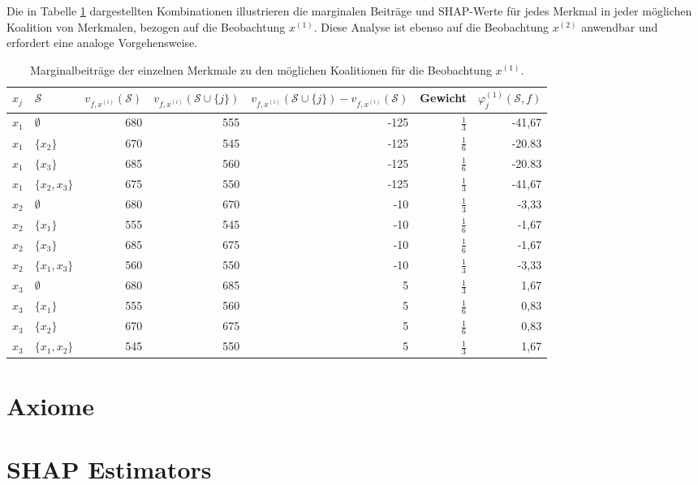 Die in Tabelle \ref{tab:shapley_marginal_features} dargestellten Kombinationen illustrieren die marginalen Beiträge und SHAP-Werte 
für jedes Merkmal in jeder möglichen Koalition von Merkmalen, bezogen auf die Beobachtung $x^{(1)}$. 
Diese Analyse ist ebenso auf die Beobachtung $x^{(2)}$ anwendbar und erfordert eine analoge Vorgehensweise.

\begin{table}[H]
    \footnotesize
    \begin{tabularx}{\textwidth}{XXrrrrr}
    \toprule
    $x_{j}$ & $\mathcal{S}$ & $v_{f, x^{(i)}}(\mathcal{S})$ & $v_{f, x^{(i)}}(\mathcal{S} \cup \{j\})$ & $v_{f, x^{(i)}}(\mathcal{S} \cup \{j\}) - v_{f, x^{(i)}}(\mathcal{S})$ & Gewicht & $\varphi_{j}^{(1)}(\mathcal{S}, f)$\\
    \midrule
    $x_1$ & $\emptyset$ & 680 & 555 & -125 & $\frac{1}{3}$ & -41,67 \\
    $x_1$ & $\{x_2\}$ & 670 & 545 & -125 & $\frac{1}{6}$ & -20.83 \\
    $x_1$ & $\{x_3\}$ & 685 & 560 & -125 & $\frac{1}{6}$ & -20.83 \\
    $x_1$ & $\{x_2, x_3\}$ & 675 & 550 & -125 & $\frac{1}{3}$ & -41,67 \\
    $x_2$ & $\emptyset$ & 680 & 670 & -10 & $\frac{1}{3}$ & -3,33 \\
    $x_2$ & $\{x_1\}$ & 555 & 545 & -10 & $\frac{1}{6}$ & -1,67 \\
    $x_2$ & $\{x_3\}$ & 685 & 675 & -10 & $\frac{1}{6}$ & -1,67 \\
    $x_2$ & $\{x_1, x_3\}$ & 560 & 550 & -10 & $\frac{1}{3}$ & -3,33 \\
    $x_3$ & $\emptyset$ & 680 & 685 & 5 & $\frac{1}{3}$ & 1,67 \\
    $x_3$ & $\{x_1\}$ & 555 & 560 & 5 & $\frac{1}{6}$ & 0,83 \\
    $x_3$ & $\{x_2\}$ & 670 & 675 & 5 & $\frac{1}{6}$ & 0,83 \\
    $x_3$ & $\{x_1, x_2\}$ & 545 & 550 & 5 & $\frac{1}{3}$ & 1,67 \\
    \bottomrule
    \end{tabularx}
    \caption{Marginalbeiträge der einzelnen Merkmale zu den möglichen Koalitionen für die Beobachtung $x^{(1)}$.}
    \label{tab:shapley_marginal_features}
\end{table}




\section{Axiome}

\section{SHAP Estimators}
\label{sec:estimators}